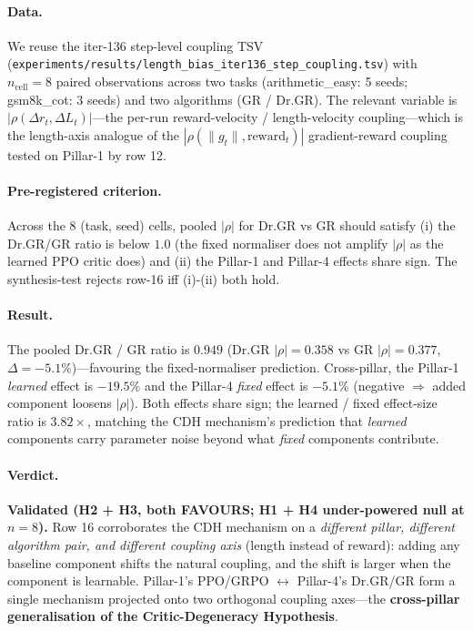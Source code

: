 \documentclass{article}
\begin{document}
\paragraph{Data.}
We reuse the iter-136 step-level coupling TSV
(\texttt{experiments/results/length\_bias\_iter136\_step\_coupling.tsv})
with $n_{\text{cell}} = 8$ paired observations across two tasks
(arithmetic\_easy: 5 seeds; gsm8k\_cot: 3 seeds) and two algorithms
(GR / Dr.GR). The relevant variable is
$|\rho(\Delta r_t,\Delta L_t)|$---the per-run reward-velocity /
length-velocity coupling---which is the length-axis analogue of
the $|\rho(\|g_t\|, \mathrm{reward}_t)|$ gradient-reward coupling
tested on Pillar-1 by row 12.

\paragraph{Pre-registered criterion.}
Across the 8 (task, seed) cells, pooled $|\rho|$ for Dr.GR vs GR
should satisfy (i) the Dr.GR/GR ratio is below $1.0$ (the fixed
normaliser does not amplify $|\rho|$ as the learned PPO critic
does) and (ii) the Pillar-1 and Pillar-4 effects share sign. The
synthesis-test rejects row-16 iff (i)-(ii) both hold.

\paragraph{Result.}
The pooled Dr.GR / GR ratio is $\mathbf{0.949}$ (Dr.GR
$|\rho|=0.358$ vs GR $|\rho|=0.377$, $\Delta=-5.1\%$)---favouring
the fixed-normaliser prediction. Cross-pillar, the Pillar-1
\emph{learned} effect is $-19.5\%$ and the Pillar-4 \emph{fixed}
effect is $-5.1\%$ (negative $\Rightarrow$ added component
loosens $|\rho|$). Both effects share sign; the learned / fixed
effect-size ratio is $\mathbf{3.82\times}$, matching the CDH
mechanism's prediction that \emph{learned} components carry
parameter noise beyond what \emph{fixed} components contribute.

\paragraph{Verdict.}
\textbf{Validated (H2 + H3, both FAVOURS; H1 + H4 under-powered
null at $n=8$).} Row 16 corroborates the CDH mechanism on a
\emph{different pillar, different algorithm pair, and different
coupling axis} (length instead of reward): adding any baseline
component shifts the natural coupling, and the shift is larger
when the component is learnable. Pillar-1's
PPO/GRPO $\leftrightarrow$ Pillar-4's Dr.GR/GR form a single
mechanism projected onto two orthogonal coupling axes---the
\textbf{cross-pillar generalisation of the Critic-Degeneracy
Hypothesis}.
 
\end{document}
